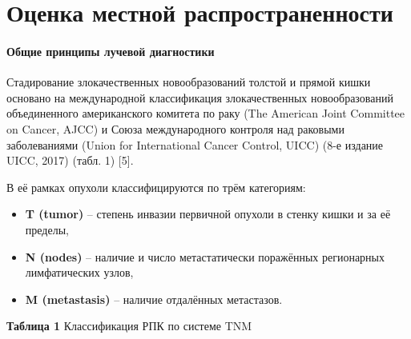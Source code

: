\documentclass[
  russian,
  12pt,
  a4paper,
]{report}
\begin{document}
\chapter{Оценка местной
распространенности}\label{ux43eux446ux435ux43dux43aux430-ux43cux435ux441ux442ux43dux43eux439-ux440ux430ux441ux43fux440ux43eux441ux442ux440ux430ux43dux435ux43dux43dux43eux441ux442ux438}

\subsubsection{Общие принципы лучевой
диагностики}\label{ux43eux431ux449ux438ux435-ux43fux440ux438ux43dux446ux438ux43fux44b-ux43bux443ux447ux435ux432ux43eux439-ux434ux438ux430ux433ux43dux43eux441ux442ux438ux43aux438-2}

Стадирование злокачественных новообразований толстой и прямой кишки
основано на международной классификация злокачественных новообразований
объединенного американского комитета по раку (The American Joint
Committee on Cancer, AJCC) и Союза международного контроля над раковыми
заболеваниями (Union for International Cancer Control, UICC) (8-е
издание UICC, 2017) (табл. 1) {[}5{]}.

В её рамках опухоли классифицируются по трём категориям:

\begin{itemize}
\item
  \textbf{T (tumor)} -- степень инвазии первичной опухоли в стенку кишки
  и за её пределы,
\item
  \textbf{N (nodes)} -- наличие и число метастатически поражённых
  регионарных лимфатических узлов,
\item
  \textbf{M (metastasis)} -- наличие отдалённых метастазов.
\end{itemize}

\textbf{Таблица 1} Классификация РПК по системе TNM
\end{document}
